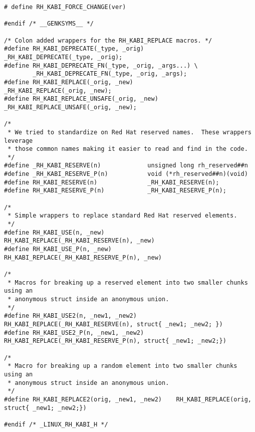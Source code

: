 \documentclass[10pt,oneside,english]{book}
\begin{document}
\begin{lstlisting}
# define RH_KABI_FORCE_CHANGE(ver)

#endif /* __GENKSYMS__ */

/* Colon added wrappers for the RH_KABI_REPLACE macros. */
#define RH_KABI_DEPRECATE(_type, _orig)         _RH_KABI_DEPRECATE(_type, _orig);
#define RH_KABI_DEPRECATE_FN(_type, _orig, _args...) \
        _RH_KABI_DEPRECATE_FN(_type, _orig, _args);
#define RH_KABI_REPLACE(_orig, _new)            _RH_KABI_REPLACE(_orig, _new);
#define RH_KABI_REPLACE_UNSAFE(_orig, _new)     _RH_KABI_REPLACE_UNSAFE(_orig, _new);

/*
 * We tried to standardize on Red Hat reserved names.  These wrappers leverage
 * those common names making it easier to read and find in the code.
 */
#define _RH_KABI_RESERVE(n)             unsigned long rh_reserved##n
#define _RH_KABI_RESERVE_P(n)           void (*rh_reserved##n)(void)
#define RH_KABI_RESERVE(n)              _RH_KABI_RESERVE(n);
#define RH_KABI_RESERVE_P(n)            _RH_KABI_RESERVE_P(n);

/*
 * Simple wrappers to replace standard Red Hat reserved elements.
 */
#define RH_KABI_USE(n, _new)            RH_KABI_REPLACE(_RH_KABI_RESERVE(n), _new)
#define RH_KABI_USE_P(n, _new)          RH_KABI_REPLACE(_RH_KABI_RESERVE_P(n), _new)

/*
 * Macros for breaking up a reserved element into two smaller chunks using an
 * anonymous struct inside an anonymous union.
 */
#define RH_KABI_USE2(n, _new1, _new2)   RH_KABI_REPLACE(_RH_KABI_RESERVE(n), struct{ _new1; _new2; })
#define RH_KABI_USE2_P(n, _new1, _new2) RH_KABI_REPLACE(_RH_KABI_RESERVE_P(n), struct{ _new1; _new2;})

/*
 * Macro for breaking up a random element into two smaller chunks using an
 * anonymous struct inside an anonymous union.
 */
#define RH_KABI_REPLACE2(orig, _new1, _new2)    RH_KABI_REPLACE(orig, struct{ _new1; _new2;})

#endif /* _LINUX_RH_KABI_H */
\end{lstlisting}
\end{document}
